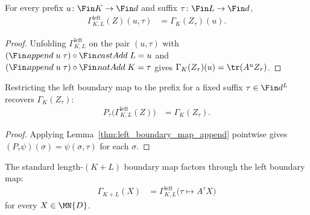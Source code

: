 \begin{lemma}\label{thm:left_boundary_map_append}
    \leanok
    For every prefix $u\colon\Fin K\to\Fin d$ and suffix $\tau\colon\Fin L\to\Fin d$,
    \begin{align}
        \Gamma^{\mathrm{left}}_{K,L}(Z)(u,\tau)
         & =\Gamma_K(Z_\tau)(u).
    \end{align}
\end{lemma}

\begin{proof}
    \leanok
    Unfolding $\Gamma^{\mathrm{left}}_{K,L}$ on the pair
    $(u,\tau)$ with $(\Fin.\!append\;u\;\tau)\circ\Fin.\!castAdd\;L=u$ and
    $(\Fin.\!append\;u\;\tau)\circ\Fin.\!natAdd\;K=\tau$ gives
    $\Gamma_K(Z_\tau)(u)=\tr(A^u Z_\tau)$.
\end{proof}

\begin{lemma}\label{thm:prefix_restrict_left_boundary_map}
    \leanok
    Restricting the left boundary map to the prefix for a fixed suffix
    $\tau\in\Fin d^L$ recovers $\Gamma_K(Z_\tau)$:
    \begin{align}
        P_\tau\bigl(\Gamma^{\mathrm{left}}_{K,L}(Z)\bigr)
         & =\Gamma_K(Z_\tau).
    \end{align}
\end{lemma}

\begin{proof}
    \leanok
    Applying Lemma~\ref{thm:left_boundary_map_append} pointwise gives
    $(P_\tau\psi)(\sigma)=\psi(\sigma,\tau)$ for each $\sigma$.
\end{proof}

\begin{lemma}\label{thm:left_boundary_map_factorization}
    \leanok
    The standard length-$(K+L)$ boundary map factors through the left boundary map:
    \begin{align}
        \Gamma_{K+L}(X)
         & =\Gamma^{\mathrm{left}}_{K,L}\bigl(\tau\mapsto A^{\tau}X\bigr)
    \end{align}
    for every $X\in\MN{D}$.
\end{lemma}

